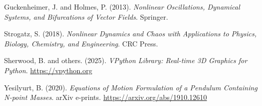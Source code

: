 \documentclass[letterpaper,12pt]{article}
\begin{document}
\begin{enumerate}[leftmargin=*, itemsep=1em]


\begin{thebibliography}{00}

Guckenheimer, J. and Holmes, P. (2013). \textit{Nonlinear Oscillations, Dynamical Systems, and Bifurcations of Vector Fields}. Springer.

Strogatz, S. (2018). \textit{Nonlinear Dynamics and Chaos with Applications to Physics, Biology, Chemistry, and Engineering}. CRC Press.

Sherwood, B. and others. (2025). \textit{VPython Library: Real-time 3D Graphics for Python}. \url{https://vpython.org}

Yesilyurt, B. (2020). \textit{Equations of Motion Formulation of a Pendulum Containing N-point Masses}. arXiv e-prints. \url{https://arxiv.org/abs/1910.12610}

\end{thebibliography}

\end{enumerate}

\thispagestyle{ack_footer}
\end{document}
